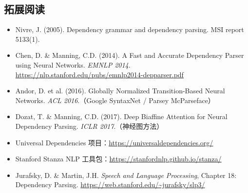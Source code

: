 \documentclass[a4paper]{article}
\begin{document}
\subsection{拓展阅读}

\begin{itemize}
    \item Nivre, J. (2005). Dependency grammar and dependency parsing. MSI report 5133(1).
    \item Chen, D. \& Manning, C.D. (2014). A Fast and Accurate Dependency Parser using Neural Networks. \textit{EMNLP 2014}. \url{https://nlp.stanford.edu/pubs/emnlp2014-depparser.pdf}
    \item Andor, D. et al. (2016). Globally Normalized Transition-Based Neural Networks. \textit{ACL 2016}.（Google SyntaxNet / Parsey McParseface）
    \item Dozat, T. \& Manning, C.D. (2017). Deep Biaffine Attention for Neural Dependency Parsing. \textit{ICLR 2017}.（神经图方法）
    \item Universal Dependencies 项目：\url{https://universaldependencies.org/}
    \item Stanford Stanza NLP 工具包：\url{https://stanfordnlp.github.io/stanza/}
    \item Jurafsky, D. \& Martin, J.H. \textit{Speech and Language Processing}, Chapter 18: Dependency Parsing. \url{https://web.stanford.edu/~jurafsky/slp3/}
\end{itemize}
\end{document}

